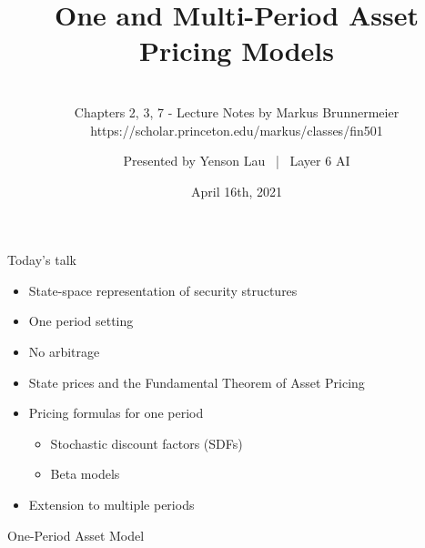 \documentclass[aspectratio=1610]{beamer}
\title{One and Multi-Period Asset Pricing Models}
\subtitle{\small{  \ \\
  Chapters 2, 3, 7 - Lecture Notes by Markus Brunnermeier https://scholar.princeton.edu/markus/classes/fin501
}}
\author{Presented by Yenson Lau \ | \ Layer 6 AI}
\date{April 16th, 2021}
\begin{document}
\maketitle


\begin{frame}{Today's talk}
\begin{itemize} \setlength\itemsep{1em}
\item State-space representation of security structures
\item One period setting
\item No arbitrage
\item State prices and the Fundamental Theorem of Asset Pricing
\item Pricing formulas for one period
  \begin{itemize}
    \item Stochastic discount factors (SDFs)
    \item Beta models
  \end{itemize}
\item Extension to multiple periods
\end{itemize}
\end{frame}

\begin{frame}
\huge{One-Period Asset Model}
\end{frame}
\end{document}
